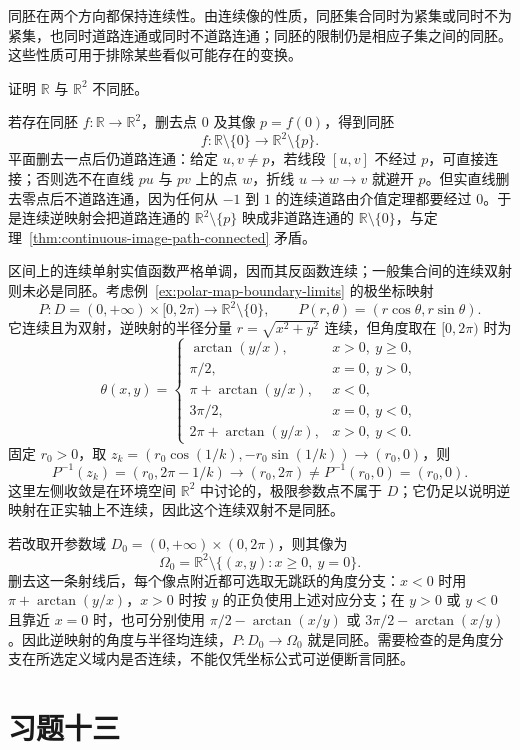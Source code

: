 同胚在两个方向都保持连续性。由连续像的性质，同胚集合同时为紧集或同时不为紧集，也同时道路连通或同时不道路连通；同胚的限制仍是相应子集之间的同胚。这些性质可用于排除某些看似可能存在的变换。

\begin{example}
\label{ex:real-line-plane-not-homeomorphic}
证明 $\mathbb R$ 与 $\mathbb R^2$ 不同胚。
\end{example}

\begin{solve}
若存在同胚 $f:\mathbb R\to\mathbb R^2$，删去点 $0$ 及其像 $p=f(0)$，得到同胚
\[
    f:\mathbb R\setminus\{0\}\longrightarrow\mathbb R^2\setminus\{p\}.
\]
平面删去一点后仍道路连通：给定 $u,v\neq p$，若线段 $[u,v]$ 不经过 $p$，可直接连接；否则选不在直线 $pu$ 与 $pv$ 上的点 $w$，折线 $u\to w\to v$ 就避开 $p$。但实直线删去零点后不道路连通，因为任何从 $-1$ 到 $1$ 的连续道路由介值定理都要经过 $0$。于是连续逆映射会把道路连通的 $\mathbb R^2\setminus\{p\}$ 映成非道路连通的 $\mathbb R\setminus\{0\}$，与定理~\ref{thm:continuous-image-path-connected} 矛盾。
\end{solve}

区间上的连续单射实值函数严格单调，因而其反函数连续；一般集合间的连续双射则未必是同胚。考虑例~\ref{ex:polar-map-boundary-limits} 的极坐标映射
\[
    P:D=(0,+\infty)\times[0,2\pi)\longrightarrow
          \mathbb R^2\setminus\{0\},\qquad
    P(r,\theta)=(r\cos\theta,r\sin\theta).
\]
它连续且为双射，逆映射的半径分量 $r=\sqrt{x^2+y^2}$ 连续，但角度取在 $[0,2\pi)$ 时为
\[
    \theta(x,y)=\begin{cases}
        \arctan(y/x),&x>0,\ y\geq0,\\
        \pi/2,&x=0,\ y>0,\\
        \pi+\arctan(y/x),&x<0,\\
        3\pi/2,&x=0,\ y<0,\\
        2\pi+\arctan(y/x),&x>0,\ y<0.
    \end{cases}
\]
固定 $r_0>0$，取 $z_k=(r_0\cos(1/k),-r_0\sin(1/k))\to(r_0,0)$，则
\[
    P^{-1}(z_k)=(r_0,2\pi-1/k)\to(r_0,2\pi)
       \neq P^{-1}(r_0,0)=(r_0,0).
\]
这里左侧收敛是在环境空间 $\mathbb R^2$ 中讨论的，极限参数点不属于 $D$；它仍足以说明逆映射在正实轴上不连续，因此这个连续双射不是同胚。

若改取开参数域 $D_0=(0,+\infty)\times(0,2\pi)$，则其像为
\[
    \Omega_0=\mathbb R^2\setminus\{(x,y):x\geq0,\ y=0\}.
\]
删去这一条射线后，每个像点附近都可选取无跳跃的角度分支：$x<0$ 时用 $\pi+\arctan(y/x)$，$x>0$ 时按 $y$ 的正负使用上述对应分支；在 $y>0$ 或 $y<0$ 且靠近 $x=0$ 时，也可分别使用 $\pi/2-\arctan(x/y)$ 或 $3\pi/2-\arctan(x/y)$。因此逆映射的角度与半径均连续，$P:D_0\to\Omega_0$ 就是同胚。需要检查的是角度分支在所选定义域内是否连续，不能仅凭坐标公式可逆便断言同胚。

\section*{习题十三}
